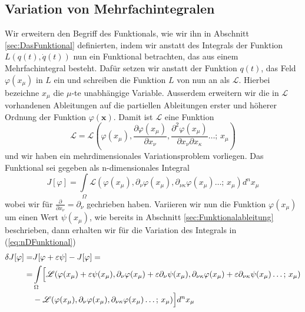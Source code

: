 \subsection{Variation von Mehrfachintegralen}
Wir erweitern den Begriff des Funktionals, wie wir ihn in Abschnitt
\ref{sec:DasFunktional} definierten, indem wir anstatt des Integrals der
Funktion $L(q(t),\dot q(t))$ nun ein Funktional betrachten, das aus einem
Mehrfachintegral besteht. Dafür setzen wir anstatt der Funktion $q(t)$, das
Feld $\varphi(x_{\mu})$ in $L$ ein und schreiben die Funktion $L$ von nun an
als $\mathcal{L}$. Hierbei bezeichne $x_{\mu}$ die $\mu$-te unabhängige
Variable. Ausserdem erweitern wir die in $\mathcal{L}$ vorhandenen Ableitungen
auf die partiellen Ableitungen erster und höherer Ordnung der Funktion
$\varphi(\mathbf{x})$. Damit ist $\mathcal{L}$ eine Funktion 
\begin{equation}\label{eq:LagrangeDensity}
  \mathcal{L}=\mathcal{L}\left(\varphi(x_\mu),\frac{\partial\varphi(x_\mu)}{\partial x_{\nu}},
  \frac{\partial^2\varphi(x_\mu)}{\partial x_{\nu}\partial x_{\kappa}}\dots ;\, x_\mu\right)
\end{equation}
und wir haben ein mehrdimensionales Variationsproblem vorliegen. Das Funktional
sei gegeben als n-dimensionales Integral
\begin{equation}\label{eq:nDFunktional}
  J[\varphi]=\int\limits_{\Omega}\mathcal{L}\left(
    \varphi(x_\mu),\partial_{\nu}\varphi(x_\mu),
    \partial_{\nu\kappa}\varphi(x_\mu)\dots ;\, x_\mu\right)d^nx_\mu
\end{equation}
wobei wir für $\frac{\partial}{\partial x_{\nu}}=\partial_{\nu}$ gechrieben
haben. Variieren wir nun die Funktion $\varphi(x_\mu)$ um einen Wert 
$\psi(x_\mu)$, wie bereits in Abschnitt \ref{sec:Funktionalableitung}
beschrieben, dann erhalten wir für die Variation des Integrals in
(\ref{eq:nDFunktional})
\begin{align} \label{eq:VariationFeld}
  \delta J[\varphi]=& J[\varphi+\varepsilon\psi]-J[\varphi]=\\
  =&\int\limits_{\Omega}\Bigl[\mathcal{L}(
    \varphi(x_\mu)+\varepsilon\psi(x_\mu),
      \partial_{\nu}\varphi(x_\mu)+\varepsilon\partial_{\nu}\psi(x_\mu),
      \partial_{\nu\kappa}\varphi(x_\mu)+\varepsilon\partial_{\nu\kappa}\psi(x_\mu)\dots ;\, x_\mu)\nonumber\\
      &-\mathcal{L}( \varphi(x_\mu),\partial_{\nu}\varphi(x_\mu),
     \partial_{\nu\kappa}\varphi(x_\mu)\dots ;\, x_\mu)\Bigr]d^n x_\mu \nonumber
\end{align}

